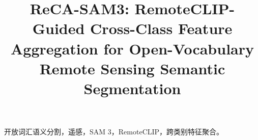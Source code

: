 \documentclass[journal]{IEEEtran}
\title{ReCA-SAM3: RemoteCLIP-Guided Cross-Class Feature Aggregation for Open-Vocabulary Remote Sensing Semantic Segmentation}
\author{}
\begin{document}
\flushbottom
\maketitle

\begin{IEEEkeywords}
开放词汇语义分割，遥感，SAM 3，RemoteCLIP，跨类别特征聚合。
\end{IEEEkeywords}







\end{document}
